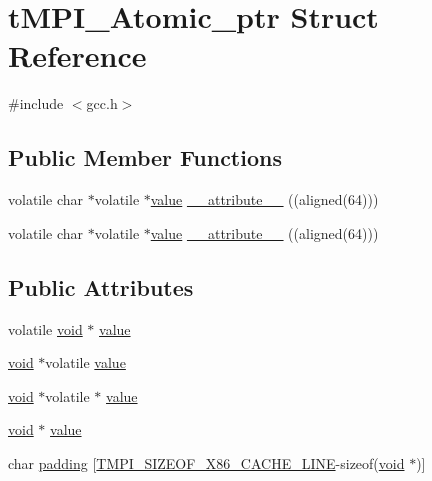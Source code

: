 \hypertarget{structtMPI__Atomic__ptr}{\section{t\-M\-P\-I\-\_\-\-Atomic\-\_\-ptr \-Struct \-Reference}
\label{structtMPI__Atomic__ptr}
}


{\ttfamily \#include $<$gcc.\-h$>$}

\subsection*{\-Public \-Member \-Functions}
\begin{DoxyCompactItemize}
\item 
volatile char $\ast$volatile $\ast$\hyperlink{structtMPI__Atomic__ptr_a44cda5cb05ffffd06dd44f495000ef55}{value} \hyperlink{structtMPI__Atomic__ptr_aaaedf2b2cb930e4404cde8cd8a23b93c}{\-\_\-\-\_\-attribute\-\_\-\-\_\-} ((aligned(64)))
\item 
volatile char $\ast$volatile $\ast$\hyperlink{structtMPI__Atomic__ptr_a44cda5cb05ffffd06dd44f495000ef55}{value} \hyperlink{structtMPI__Atomic__ptr_aaaedf2b2cb930e4404cde8cd8a23b93c}{\-\_\-\-\_\-attribute\-\_\-\-\_\-} ((aligned(64)))
\end{DoxyCompactItemize}
\subsection*{\-Public \-Attributes}
\begin{DoxyCompactItemize}
\item 
volatile \hyperlink{nbnxn__kernel__simd__4xn__outer_8h_a8dc3f4a797ed992dff49d2fa3477eee8}{void} $\ast$ \hyperlink{structtMPI__Atomic__ptr_a44cda5cb05ffffd06dd44f495000ef55}{value}
\item 
\hyperlink{nbnxn__kernel__simd__4xn__outer_8h_a8dc3f4a797ed992dff49d2fa3477eee8}{void} $\ast$volatile \hyperlink{structtMPI__Atomic__ptr_a6a3c46cb46c82ac81755969a44b09bba}{value}
\item 
\hyperlink{nbnxn__kernel__simd__4xn__outer_8h_a8dc3f4a797ed992dff49d2fa3477eee8}{void} $\ast$volatile $\ast$ \hyperlink{structtMPI__Atomic__ptr_a1fe92a78f8748e8fed32f668a5101541}{value}
\item 
\hyperlink{nbnxn__kernel__simd__4xn__outer_8h_a8dc3f4a797ed992dff49d2fa3477eee8}{void} $\ast$ \hyperlink{structtMPI__Atomic__ptr_a96a224af4958cc4ca57b99c75575c299}{value}
\item 
char \hyperlink{structtMPI__Atomic__ptr_ab284a1cde6faf2adf673ae288f47a63c}{padding} \mbox{[}\hyperlink{share_2template_2gromacs_2thread__mpi_2atomic_2gcc__x86_8h_aecf8996b3f8284831e7b2b0dca7e681d}{\-T\-M\-P\-I\-\_\-\-S\-I\-Z\-E\-O\-F\-\_\-\-X86\-\_\-\-C\-A\-C\-H\-E\-\_\-\-L\-I\-N\-E}-\/sizeof(\hyperlink{nbnxn__kernel__simd__4xn__outer_8h_a8dc3f4a797ed992dff49d2fa3477eee8}{void} $\ast$)\mbox{]}
\end{DoxyCompactItemize}



